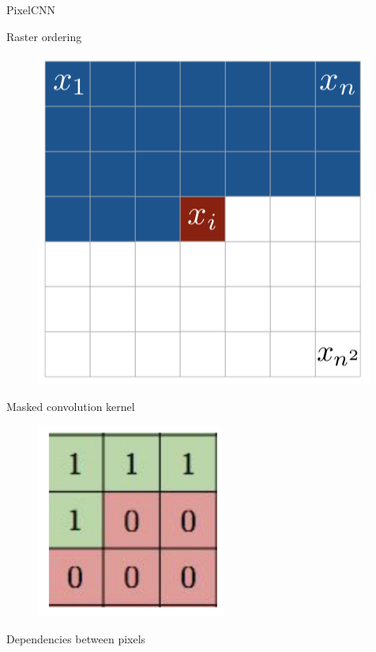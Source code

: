 \begin{frame}{PixelCNN}
	\begin{minipage}[t]{0.5\columnwidth}
		\begin{block}{Raster ordering}
			\begin{figure}
				\centering
		        \includegraphics[width=0.7\linewidth]{figs/pixelcnn1.png}
			\end{figure}
		\end{block}
		\vspace{-0.5cm}
		\begin{block}{Masked convolution kernel}
			\begin{figure}
				\centering
		        \includegraphics[width=0.35\linewidth]{figs/pixelcnn_0_1.png}
			\end{figure}
		\end{block}
	\end{minipage}%
	\begin{minipage}[t]{0.5\columnwidth}
		\begin{block}{Dependencies between pixels}
			\begin{figure}
				\centering

\end{figure}
\end{block}
\end{minipage}
\end{frame}

